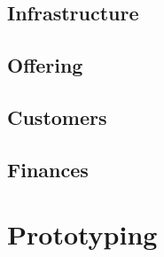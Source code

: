 \documentclass{article}
\begin{document}
\subsection{Infrastructure}

\subsection{Offering}

\subsection{Customers}

 \subsection{Finances}
\section{Prototyping}
\end{document}
